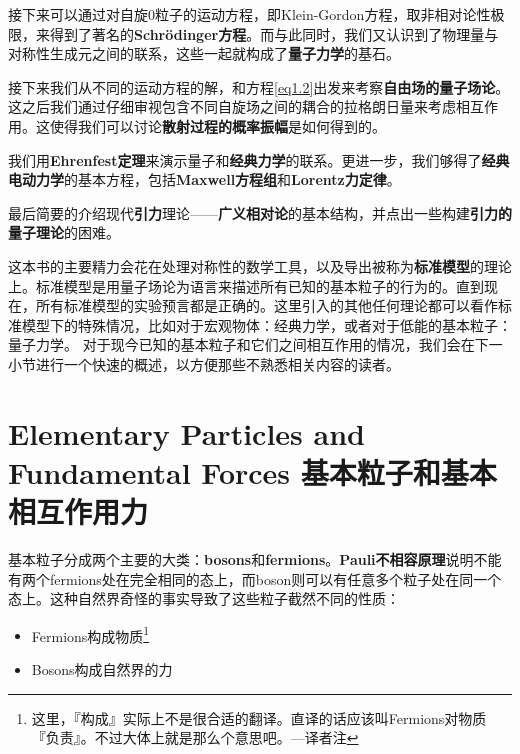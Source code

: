 接下来可以通过对自旋$0$粒子的运动方程，即Klein-Gordon方程，取非相对论性极限，来得到了著名的{\bfseries Schrödinger方程}。而与此同时，我们又认识到了物理量与对称性生成元之间的联系，这些一起就构成了{\bfseries 量子力学}的基石。

接下来我们从不同的运动方程的解，和方程\eqref{eq1.2}出发来考察{\bfseries 自由场的量子场论}。这之后我们通过仔细审视包含不同自旋场之间的耦合的拉格朗日量来考虑相互作用。这使得我们可以讨论{\bfseries 散射过程的概率振幅}是如何得到的。

我们用{\bfseries Ehrenfest定理}来演示量子和{\bfseries 经典力学}的联系。更进一步，我们够得了{\bfseries 经典电动力学}的基本方程，包括{\bfseries Maxwell方程组}和{\bfseries Lorentz力定律}。

最后简要的介绍现代{\bfseries 引力}理论——{\bfseries 广义相对论}的基本结构，并点出一些构建{\bfseries 引力的量子理论}的困难。

这本书的主要精力会花在处理对称性的数学工具，以及导出被称为{\bfseries 标准模型}的理论上。标准模型是用量子场论为语言来描述所有已知的基本粒子的行为的。直到现在，所有标准模型的实验预言都是正确的。这里引入的其他任何理论都可以看作标准模型下的特殊情况，比如对于宏观物体：经典力学，或者对于低能的基本粒子：量子力学。
对于现今已知的基本粒子和它们之间相互作用的情况，我们会在下一小节进行一个快速的概述，以方便那些不熟悉相关内容的读者。

\section[基本粒子和基本相互作用力]{Elementary Particles and Fundamental Forces 基本粒子和基本相互作用力}\label{sec1.3}

基本粒子分成两个主要的大类：{\bfseries bosons}和{\bfseries fermions}。{\bfseries Pauli不相容原理}说明不能有两个fermions处在完全相同的态上，而boson则可以有任意多个粒子处在同一个态上。这种自然界奇怪的事实导致了这些粒子截然不同的性质：

\begin{itemize}
\item Fermions构成物质\footnote{这里，『构成』实际上不是很合适的翻译。直译的话应该叫Fermions对物质『负责』。不过大体上就是那么个意思吧。---译者注}
\item Bosons构成自然界的力
\end{itemize}

